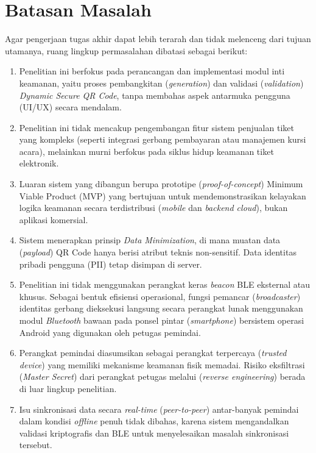 \section{Batasan Masalah}

Agar pengerjaan tugas akhir dapat lebih terarah dan tidak melenceng dari tujuan utamanya, ruang lingkup permasalahan dibatasi sebagai berikut:
\begin{enumerate}
    \item Penelitian ini berfokus pada perancangan dan implementasi modul inti keamanan, yaitu proses pembangkitan (\textit{generation}) dan validasi (\textit{validation}) \textit{Dynamic Secure QR Code}, tanpa membahas aspek antarmuka pengguna (UI/UX) secara mendalam.
    \item Penelitian ini tidak mencakup pengembangan fitur sistem penjualan tiket yang kompleks (seperti integrasi gerbang pembayaran atau manajemen kursi acara), melainkan murni berfokus pada siklus hidup keamanan tiket elektronik.
    \item Luaran sistem yang dibangun berupa prototipe (\textit{proof-of-concept}) Minimum Viable Product (MVP) yang bertujuan untuk mendemonstrasikan kelayakan logika keamanan secara terdistribusi (\textit{mobile} dan \textit{backend cloud}), bukan aplikasi komersial.
    \item Sistem menerapkan prinsip \textit{Data Minimization}, di mana muatan data (\textit{payload}) QR Code hanya berisi atribut teknis non-sensitif. Data identitas pribadi pengguna (PII) tetap disimpan di server.
    \item Penelitian ini tidak menggunakan perangkat keras \textit{beacon} BLE eksternal atau khusus. Sebagai bentuk efisiensi operasional, fungsi pemancar (\textit{broadcaster}) identitas gerbang dieksekusi langsung secara perangkat lunak menggunakan modul \textit{Bluetooth} bawaan pada ponsel pintar (\textit{smartphone}) bersistem operasi Android yang digunakan oleh petugas pemindai.
    \item Perangkat pemindai diasumsikan sebagai perangkat terpercaya (\textit{trusted device}) yang memiliki mekanisme keamanan fisik memadai. Risiko eksfiltrasi (\textit{Master Secret}) dari perangkat petugas melalui (\textit{reverse engineering}) berada di luar lingkup penelitian.
    \item Isu sinkronisasi data secara \textit{real-time} (\textit{peer-to-peer}) antar-banyak pemindai dalam kondisi \textit{offline} penuh tidak dibahas, karena sistem mengandalkan validasi kriptografis dan BLE untuk menyelesaikan masalah sinkronisasi tersebut.
\end{enumerate}

